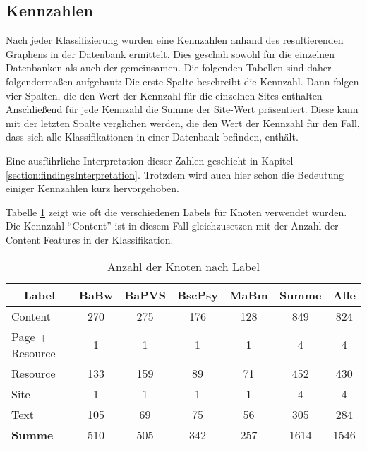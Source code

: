 \subsection{Kennzahlen}
    Nach jeder Klassifizierung wurden eine Kennzahlen anhand des
    resultierenden Graphens in der Datenbank ermittelt.
    Dies geschah sowohl für die einzelnen Datenbanken
    als auch der gemeinsamen.
    Die folgenden Tabellen sind daher folgendermaßen aufgebaut:
    Die erste Spalte beschreibt die Kennzahl.
    Dann folgen vier Spalten, die den Wert der Kennzahl für die einzelnen Sites enthalten
    Anschließend für jede Kennzahl die Summe der Site-Wert präsentiert.
    Diese kann mit der letzten Spalte verglichen werden,
    die den Wert der Kennzahl für den Fall,
    dass sich alle Klassifikationen in einer Datenbank befinden, enthält.

    Eine ausführliche Interpretation dieser Zahlen geschieht in Kapitel \ref{section:findingsInterpretation}.
    Trotzdem wird auch hier schon die Bedeutung einiger Kennzahlen kurz hervorgehoben.

    Tabelle \ref{table:findingsTeachersFiguresNodesByLabel}
    zeigt wie oft die verschiedenen Labels für Knoten verwendet wurden.
    Die Kennzahl "`Content"' ist in diesem Fall gleichzusetzen mit
    der Anzahl der Content Features in der Klassifikation.

    \begin{table}[htb]
        \centering
        \begin{tabular}{|l|c|c|c|c|c|c|}
            \hline
            \multicolumn{1}{|c|}{\textbf{Label}} & \textbf{BaBw} & \textbf{BaPVS} & \textbf{BscPsy} & \textbf{MaBm} & \textbf{Summe} & \textbf{Alle} \\ \hline
            Content                                     & 270           & 275            & 176             & 128           & 849            & 824           \\ \hline
            Page + Resource                             & 1             & 1              & 1               & 1             & 4              & 4             \\ \hline
            Resource                                    & 133           & 159            & 89              & 71            & 452            & 430           \\ \hline
            Site                                        & 1             & 1              & 1               & 1             & 4              & 4             \\ \hline
            Text                                        & 105           & 69             & 75              & 56            & 305            & 284           \\ \hline
            \hline
            \textbf{Summe}                              & 510           & 505            & 342             & 257           & 1614           & 1546          \\ \hline
        \end{tabular}
        \caption{Anzahl der Knoten nach Label}
        \label{table:findingsTeachersFiguresNodesByLabel}
    \end{table}

